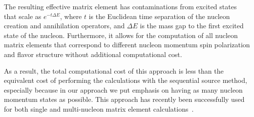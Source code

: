 The  resulting effective matrix element has contaminations from excited states that scale as $e^{-t \Delta E }$,
where $t$ is the Euclidean time separation of the nucleon creation and annihilation operators,
and $\Delta E$ is the mass gap to the first excited state of the nucleon. Furthermore, it allows for the computation of  all nucleon matrix elements that correspond to different nucleon momentum spin polarization and flavor structure without additional computational cost.

As a  result,  the total computational cost of this approach is less than the equivalent cost of performing the calculations with the sequential source method, especially because in our approach we put emphasis on having as many nucleon momentum states as possible.  This approach has recently been successfully used for both single and multi-nucleon matrix element calculations~\cite{Berkowitz:2017gql,Tiburzi:2017iux,Shanahan:2017bgi}.

